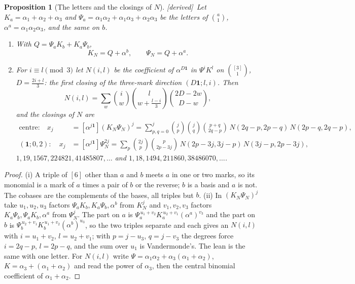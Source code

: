 \documentclass[11pt]{article}
\newcommand{\one}{\mathbf 1}
\theoremstyle{plain}
\newtheorem{proposition}{Proposition}[section]
\theoremstyle{definition}
\theoremstyle{remark}
\newcommand{\derived}{\textup{[derived]}}
\begin{document}
\begin{proposition}[The letters and the closings of $N$]\label{b:p:Nclos}\derived\
Let $K_a=\alpha_1+\alpha_2+\alpha_3$ and $\Psi_a=\alpha_1\alpha_2+\alpha_1\alpha_3+\alpha_2\alpha_3$ be the letters of $\binom a1$, $\alpha^a=\alpha_1\alpha_2\alpha_3$, and the same on $b$.
\begin{enumerate}[label=(\roman*)]
\item With $Q=\Psi_aK_b+K_a\Psi_b$,
\[
K_N=Q+\alpha^b,\qquad \Psi_N=Q+\alpha^a .
\]
\item For $i\equiv l\pmod 3$ let $N(i,l)$ be the coefficient of $\alpha^{D\one}$ in $\Psi^iK^l$ on $\binom{[3]}1$, $D=\frac{2i+l}3$: the first closing of the three-mark direction $(D\one;l,i)$. Then
\[
N(i,l)=\sum_w\binom iw\binom l{w+\frac{l-i}3}\binom{2D-2w}{D-w},
\]
and the closings of $N$ are
\begin{align*}
\text{centre:}\quad x_j&=[\alpha^{j\one}](K_N\Psi_N)^j=\sum_{p,q=0}^j\binom jp\binom jq\binom{p+q}{2q-p}\,N(2q-p,2p-q)\,N(2p-q,2q-p),\\
(\one;0,2):\quad x_j&=[\alpha^{j\one}]\Psi_N^{2j}=\sum_{p}\binom{2j}p\binom p{2p-3j}\,N(2p-3j,3j-p)\,N(3j-p,2p-3j),
\end{align*}
$1,19,1567,224821,41485807,\dots$ and $1,18,1494,211860,38486070,\dots$.
\end{enumerate}
\end{proposition}

\begin{proof}
(i) A triple of $[6]$ other than $a$ and $b$ meets $a$ in one or two marks, so its monomial is a mark of $a$ times a pair of $b$ or the reverse; $b$ is a basis and $a$ is not. The cobases are the complements of the bases, all triples but $b$. (ii) In $(K_N\Psi_N)^j$ take $u_1,u_2,u_3$ factors $\Psi_aK_b,K_a\Psi_b,\alpha^b$ from $K_N^j$ and $v_1,v_2,v_3$ factors $K_a\Psi_b,\Psi_aK_b,\alpha^a$ from $\Psi_N^j$. The part on $a$ is $\Psi_a^{\,u_1+v_2}K_a^{\,u_2+v_1}(\alpha^a)^{v_3}$ and the part on $b$ is $\Psi_b^{\,u_2+v_1}K_b^{\,u_1+v_2}(\alpha^b)^{u_3}$, so the two triples separate and each gives an $N(i,l)$ with $i=u_1+v_2$, $l=u_2+v_1$; with $p=j-u_3$, $q=j-v_3$ the degrees force $i=2q-p$, $l=2p-q$, and the sum over $u_1$ is Vandermonde's. The lean is the same with one letter. For $N(i,l)$ write $\Psi=\alpha_1\alpha_2+\alpha_3(\alpha_1+\alpha_2)$, $K=\alpha_3+(\alpha_1+\alpha_2)$ and read the power of $\alpha_3$, then the central binomial coefficient of $\alpha_1+\alpha_2$.
\end{proof}
\end{document}
